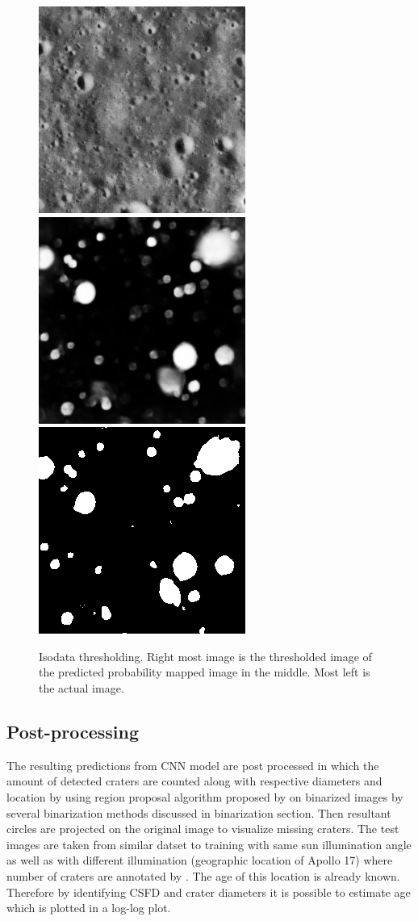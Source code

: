 \documentclass[11pt]{article}
\begin{document}
\begin{figure}[H]
	\includegraphics[width=.3\textwidth]{files/results/26.png}\hfill	
	\includegraphics[width=.3\textwidth]{files/results/26_predict.png}\hfill
	\includegraphics[width=.3\textwidth]{files/results/isodata.png}\hfill
	\caption{Isodata thresholding. Right most image is the thresholded image of the predicted probability mapped image in the middle. Most left is the actual image.}
	\label{isodata thresholding}
\end{figure}

\subsection{Post-processing}
The resulting predictions from CNN model are post processed in which the amount of detected craters are counted along with respective diameters and location by using region proposal algorithm proposed by \cite{burger2009principles} on binarized images by several binarization methods discussed in binarization section. Then resultant circles are projected on the original image to visualize missing craters. The test images are taken from similar datset to training with same sun illumination angle as well as with different illumination (geographic location of Apollo 17) where number of craters are annotated by \cite{dino2020}. The age of this location is already known. Therefore by identifying CSFD and crater diameters it is possible to estimate age which is plotted in a log-log plot.
\end{document}
